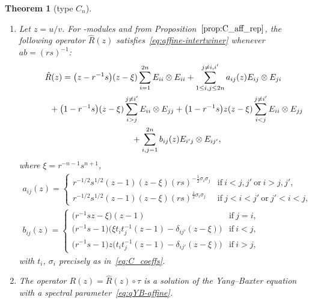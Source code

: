 \documentclass[pdftex]{sigma}
\numberwithin{equation}{section}
\newtheorem{Theorem}{Theorem}[section]
\newcommand{\ssp}{\mathfrak{sp}}
\begin{document}
\begin{Theorem}[type $C_{n}$]\label{thm:C_AffRMatrix}\quad
\begin{enumerate}
\item[$(a)$] Let $z=u/v$. For \smash{$U_{r,s}\big(\widehat{\ssp}_{2n}\big)$}-modules  and  from Proposition~$\ref{prop:C_aff_rep}$, the following operator $\hat{R}(z)$ satisfies~\eqref{eq:affine-intertwiner} whenever $ab = (rs)^{-1}$:
\begin{gather}
 \hat{R}(z) = \bigl(z - r^{-1}s\bigr)(z - \xi)\sum_{i = 1}^{2n}E_{ii} \otimes E_{ii} + \sum_{1 \le i,j \le 2n}^{j \neq i,i'}a_{ij}(z)E_{ij} \otimes E_{ji}\nonumber \\
 \hphantom{\hat{R}(z) =}{} + \bigl(1 - r^{-1}s\bigr)(z - \xi)\sum_{i > j}^{j \neq i'}E_{ii} \otimes E_{jj} +\bigl(1 - r^{-1}s\bigr)z(z - \xi)\sum_{i < j}^{j \neq i'}E_{ii} \otimes E_{jj} \nonumber\\
 \hphantom{\hat{R}(z) =}{} + \sum_{i,j = 1}^{2n} b_{ij}(z)E_{i'j} \otimes E_{ij'},\label{eq:C_AffRMatrix}
\end{gather}
where $\xi = r^{-n - 1}s^{n + 1}$,
\begin{gather*}
 a_{ij}(z) =
 \begin{cases}
 r^{-1/2}s^{1/2}(z - 1)(z - \xi)(rs)^{-\frac{1}{2}\sigma_{i}\sigma_{j}} &
 \text{if}\ i < j,j'\ \text{or}\ i > j,j', \\
 r^{-1/2}s^{1/2}(z - 1)(z - \xi)(rs)^{\frac{1}{2}\sigma_{i}\sigma_{j}} &
 \text{if}\ j < i < j'\ \text{or}\ j' < i < j,
 \end{cases}
\\
 b_{ij}(z) =
 \begin{cases}
 \bigl(r^{-1}sz - \xi\bigr)(z - 1) & \text{if}\ j = i, \\
 \bigl(r^{-1}s - 1\bigr)\bigl(\xi t_{i}t_{j}^{-1}(z - 1) - \delta_{ij'}(z - \xi)\bigr) & \text{if}\ i < j ,\\
 \bigl(r^{-1}s - 1\bigr)z\bigl(t_{i}t_{j}^{-1}(z - 1) - \delta_{ij'}(z - \xi)\bigr) & \text{if}\ i > j,
 \end{cases}
\end{gather*}
with $t_{i}$, $\sigma_{i}$ precisely as in~\eqref{eq:C_coeffs}.

\item[$(b)$] The operator $R(z)=\hat{R}(z)\circ \tau$ is a solution of the Yang--Baxter equation with a spectral parameter~\eqref{eq:qYB-affine}.
\end{enumerate}
\end{Theorem}
\end{document}
